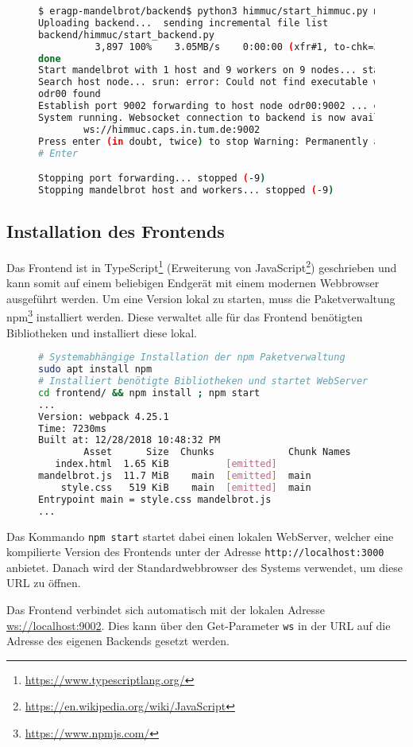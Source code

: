 \begin{figure}
	\begin{lstlisting}[language=bash, caption={Beispielausgabe bei Start der Entwicklungsumbegung auf dem HimMUC}, label={shell:start_himmuc_example}]
$ eragp-mandelbrot/backend$ python3 himmuc/start_himmuc.py muendler 10 9
Uploading backend...  sending incremental file list
backend/himmuc/start_backend.py
          3,897 100%    3.05MB/s    0:00:00 (xfr#1, to-chk=35/62)
done
Start mandelbrot with 1 host and 9 workers on 9 nodes... started mandelbrot
Search host node... srun: error: Could not find executable worker
odr00 found
Establish port 9002 forwarding to host node odr00:9002 ... established
System running. Websocket connection to backend is now available at
        ws://himmuc.caps.in.tum.de:9002
Press enter (in doubt, twice) to stop Warning: Permanently added the ED25519 host key for IP address '10.42.0.54' to the list of known hosts.
# Enter

Stopping port forwarding... stopped (-9)
Stopping mandelbrot host and workers... stopped (-9)
    \end{lstlisting}
\end{figure}

\subsection{Installation des Frontends}
Das Frontend ist in TypeScript\footnote{\url{https://www.typescriptlang.org/}} (Erweiterung von JavaScript\footnote{\url{https://en.wikipedia.org/wiki/JavaScript}})
geschrieben und kann somit auf einem beliebigen Endgerät mit einem modernen Webbrowser ausgeführt werden.
Um eine Version lokal zu starten, muss die Paketverwaltung npm\footnote{\url{https://www.npmjs.com/}} installiert werden. Diese verwaltet alle
für das Frontend benötigten Bibliotheken und installiert diese lokal.

\begin{figure}[h!]
	\begin{lstlisting}[language=bash, caption={Starten des Frontends mit beispielhafter Ausgabe}]
# Systemabhängige Installation der npm Paketverwaltung
sudo apt install npm
# Installiert benötigte Bibliotheken und startet WebServer
cd frontend/ && npm install ; npm start
...
Version: webpack 4.25.1
Time: 7230ms
Built at: 12/28/2018 10:48:32 PM
        Asset      Size  Chunks             Chunk Names
   index.html  1.65 KiB          [emitted]
mandelbrot.js  11.7 MiB    main  [emitted]  main
    style.css   519 KiB    main  [emitted]  main
Entrypoint main = style.css mandelbrot.js
...
        \end{lstlisting}
\end{figure}

Das Kommando \verb|npm start| startet dabei einen lokalen WebServer, welcher eine kompilierte Version des Frontends
unter der Adresse \verb|http://localhost:3000| anbietet. Danach wird der Standardwebbrowser des Systems verwendet, um diese
URL zu öffnen.

Das Frontend verbindet sich automatisch mit der lokalen Adresse \url{ws://localhost:9002}.
Dies kann über den Get-Parameter \verb|ws| in der URL auf die Adresse des eigenen Backends gesetzt werden.